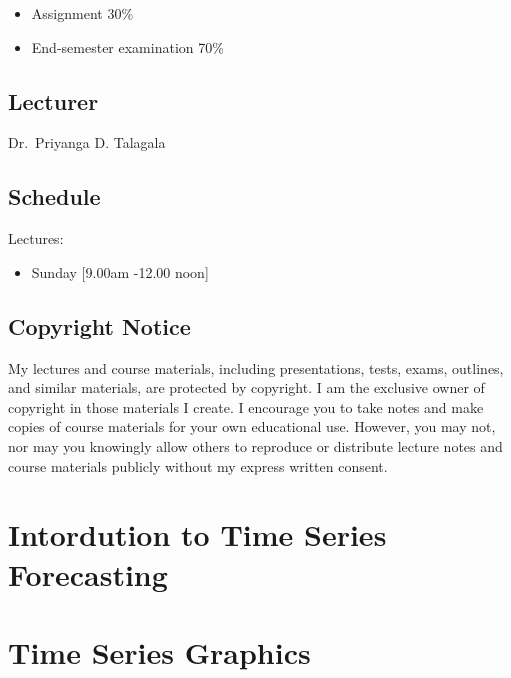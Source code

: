 \documentclass[]{book}
\providecommand{\tightlist}{%
  \setlength{\itemsep}{0pt}\setlength{\parskip}{0pt}}
\begin{document}
\begin{itemize}
\tightlist
\item
  Assignment 30\%
\item
  End-semester examination 70\%
\end{itemize}

\hypertarget{lecturer}{%
\section*{Lecturer}\label{lecturer}}

Dr.~Priyanga D. Talagala

\hypertarget{schedule}{%
\section*{Schedule}\label{schedule}}

Lectures:

\begin{itemize}
\tightlist
\item
  Sunday {[}9.00am -12.00 noon{]}
\end{itemize}

\hypertarget{copyright-notice}{%
\section*{Copyright Notice}\label{copyright-notice}}

My lectures and course materials, including presentations, tests, exams, outlines, and similar materials, are protected by copyright. I am the exclusive owner of copyright in those materials I create. I encourage you to take notes and make copies of course materials for your own educational use. However, you may not, nor may you knowingly allow others to reproduce or distribute lecture notes and course materials publicly without my express written consent.

\hypertarget{intro}{%
\chapter{Intordution to Time Series Forecasting}\label{intro}}

\hypertarget{time-series-graphics}{%
\chapter{Time Series Graphics}\label{time-series-graphics}}
\end{document}
